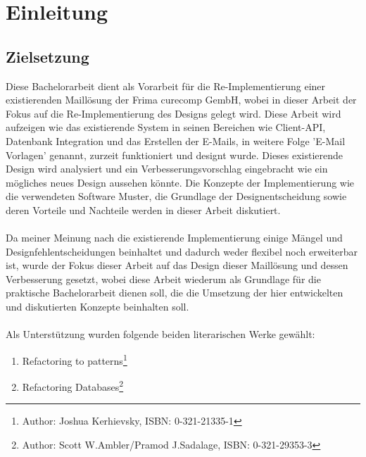 \chapter{Einleitung}
\label{cha:Einleitung}

\section{Zielsetzung}
Diese Bachelorarbeit dient als Vorarbeit für die Re-Implementierung einer existierenden Maillösung  der Frima curecomp GembH, wobei in dieser Arbeit der Fokus auf die Re-Implementierung des Designs gelegt wird. Diese Arbeit wird aufzeigen wie das existierende System in seinen Bereichen wie Client-API, Datenbank Integration und das Erstellen der E-Mails, in weitere Folge 'E-Mail Vorlagen' genannt, zurzeit funktioniert und designt wurde. Dieses existierende Design wird analysiert und ein Verbesserungsvorschlag eingebracht wie ein mögliches neues Design aussehen könnte. Die Konzepte der Implementierung wie die verwendeten Software Muster, die Grundlage der Designentscheidung sowie deren Vorteile und Nachteile werden in dieser Arbeit diskutiert. \\\\
Da meiner Meinung nach die existierende Implementierung einige Mängel und Designfehlentscheidungen beinhaltet und dadurch weder flexibel noch erweiterbar ist, wurde der Fokus dieser Arbeit auf das Design dieser Maillösung und dessen Verbesserung gesetzt, wobei diese Arbeit wiederum als Grundlage für die praktische Bachelorarbeit dienen soll, die die Umsetzung der hier entwickelten und diskutierten Konzepte beinhalten soll. \\\\
Als Unterstützung wurden folgende beiden literarischen Werke gewählt:
\begin{enumerate}
	\item Refactoring to patterns\footnote{Author: Joshua Kerhievsky, ISBN: 0-321-21335-1}
	\item Refactoring Databases\footnote{Author: Scott W.Ambler/Pramod J.Sadalage, ISBN: 0-321-29353-3} 
\end{enumerate}
\newpage

